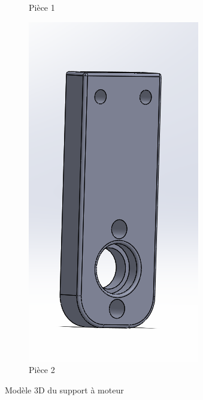 \begin{figure}[h!]
\begin{subfigure}{0.35\linewidth}
        \caption{Pièce 1}
        \label{fig:s2-cad-supportmoteur1}
    \end{subfigure}
    \begin{subfigure}{0.175\linewidth}
        \centering
        \includegraphics[width=\linewidth]{img/s2/cad/supportmoteur2}
        \caption{Pièce 2}
        \label{fig:s2-cad-supportmoteur2}
    \end{subfigure}
    \caption{Modèle 3D du support à moteur}
    \label{fig:s2-cad-supportmoteurs}
\end{figure}


